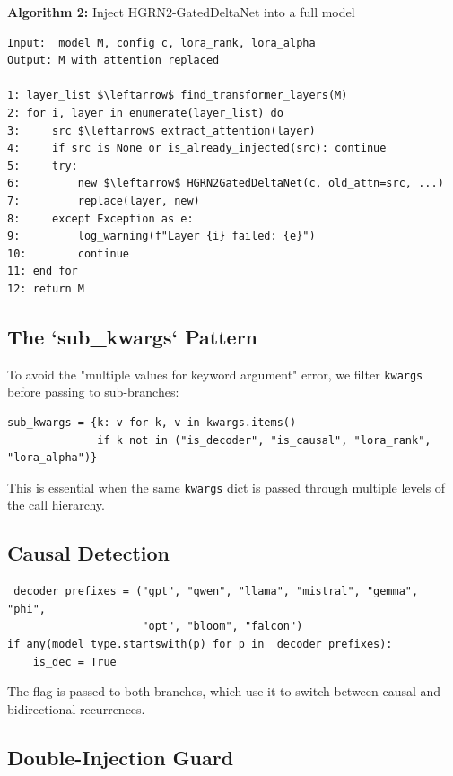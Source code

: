 \textbf{Algorithm 2:} Inject HGRN2-GatedDeltaNet into a full model
\begin{lstlisting}
Input:  model M, config c, lora_rank, lora_alpha
Output: M with attention replaced

1: layer_list $\leftarrow$ find_transformer_layers(M)
2: for i, layer in enumerate(layer_list) do
3:     src $\leftarrow$ extract_attention(layer)
4:     if src is None or is_already_injected(src): continue
5:     try:
6:         new $\leftarrow$ HGRN2GatedDeltaNet(c, old_attn=src, ...)
7:         replace(layer, new)
8:     except Exception as e:
9:         log_warning(f"Layer {i} failed: {e}")
10:        continue
11: end for
12: return M
\end{lstlisting}

\subsection{The `sub\_kwargs` Pattern}

To avoid the "multiple values for keyword argument" error, we filter 
\texttt{kwargs} before passing to sub-branches:

\begin{lstlisting}
sub_kwargs = {k: v for k, v in kwargs.items() 
              if k not in ("is_decoder", "is_causal", "lora_rank", "lora_alpha")}
\end{lstlisting}

This is essential when the same \texttt{kwargs} dict is passed through multiple 
levels of the call hierarchy.

\subsection{Causal Detection}

\begin{lstlisting}
_decoder_prefixes = ("gpt", "qwen", "llama", "mistral", "gemma", "phi", 
                     "opt", "bloom", "falcon")
if any(model_type.startswith(p) for p in _decoder_prefixes):
    is_dec = True
\end{lstlisting}

The flag is passed to both branches, which use it to switch between 
causal and bidirectional recurrences.

\subsection{Double-Injection Guard}

